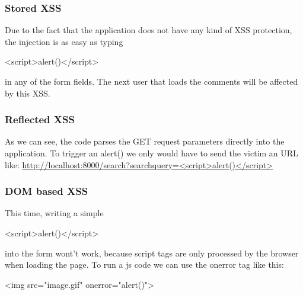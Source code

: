 \begin{Answer}[ref={websec-xss-types}]
\subsubsection{Stored XSS}
Due to the fact that the application does not have any kind of XSS protection, the injection is as easy as typing 
\begin{html}
<script>alert()</script>
\end{html}
in any of the form fields. The next user that loads the comments will be affected by this XSS.
\subsubsection{Reflected XSS}
As we can see, the code parses the GET request parameters directly into the application. To trigger an alert() we only would have to send the victim an URL like: \url{http://localhost:8000/search?searchquery=<script>alert()</script>}
\subsubsection{DOM based XSS}
This time, writing a simple \begin{html}
<script>alert()</script>
\end{html}
into the form wont't work, because script tags are only processed by the browser when loading the page. To run a js code we can use the onerror tag like this:
\begin{html}
<img src="image.gif" onerror="alert()">
\end{html}
\end{Answer}